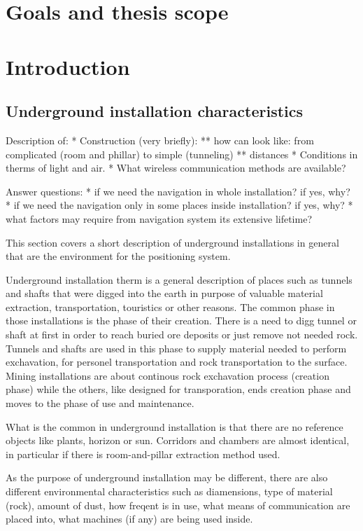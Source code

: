 \documentclass[../main.tex]{subfiles}
\begin{document}
\chapter{Goals and thesis scope}



\chapter{Introduction}

\section{Underground installation characteristics}

Description of:
* Construction (very briefly):
** how can look like: from complicated (room and phillar) to simple (tunneling)
** distances
* Conditions in therms of light and air.
* What wireless communication methods are available?

Answer questions:
* if we need the navigation in whole installation? if yes, why?
* if we need the navigation only in some places inside installation? if yes, why?
* what factors may require from navigation system its extensive lifetime?

This section covers a short description of underground installations in general that are the environment for the positioning system.

Underground installation therm is a general description of places such as tunnels and shafts that were digged into the earth in purpose of valuable material extraction, transportation, touristics or other reasons. The common phase in those installations is the phase of their creation. There is a need to digg tunnel or shaft at first in order to reach buried ore deposits or just remove not needed rock. Tunnels and shafts are used in this phase to supply material needed to perform exchavation, for personel transportation and rock transportation to the surface. Mining installations are about continous rock exchavation process (creation phase) while the others, like designed for transporation, ends creation phase and moves to the phase of use and maintenance.

What is the common in underground installation is that there are no reference objects like plants, horizon or sun. Corridors and chambers are almost identical, in particular if there is room-and-pillar extraction method used.


As the purpose of underground installation may be different, there are also different environmental characteristics such as diamensions, type of material (rock), amount of dust, how freqent is in use, what means of communication are placed into, what machines (if any) are being used inside.
\end{document}

